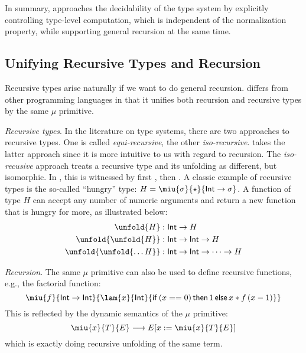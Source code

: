 In summary, \name approaches the decidability of the type system by explicitly controlling type-level computation, which is independent of the normalization property, while supporting general recursion at the same time.

\subsection{Unifying Recursive Types and Recursion}


Recursive types arise naturally if we want to do general recursion. \name differs from other programming languages in that it unifies both recursion and recursive types by the same $\mu$ primitive.

\emph{Recursive types}. In the literature on type systems, there are two approaches to recursive types. One is called \emph{equi-recursive}, the other \emph{iso-recursive}. \name takes the latter approach since it is more intuitive to us with regard to recursion. The \emph{iso-recusive} approach treats a recursive type and its unfolding as different, but isomorphic. In \name, this is witnessed by first \castup, then \castdn. A classic example of recursive types is the so-called ``hungry'' type: $H = \miu{\sigma}{\star}{\mathsf{Int} \rightarrow \sigma}$. A function of type $H$ can accept any number of numeric arguments and return a new function that is hungry for more, as illustrated below:
\begin{align*}
\unfold{H} &: \mathsf{Int} \rightarrow H  \\
\unfold{\unfold{H}} &: \mathsf{Int} \rightarrow \mathsf{Int} \rightarrow H \\
\unfold{\unfold{\dots H}} &: \mathsf{Int} \rightarrow \mathsf{Int} \rightarrow \dots \rightarrow H
\end{align*}

\emph{Recursion}. The same $\mu$ primitive can also be used to define recursive functions, e.g., the factorial function: \[\miu{f}{\mathsf{Int} \rightarrow \mathsf{Int}}{\lam{x}{\mathsf{Int}}{\mathsf{if}\,(x == 0)\,\mathsf{then}\,1\,\mathsf{else}\,x * f\,(x - 1)}}\] This is reflected by the dynamic semantics of the $\mu$ primitive: 
\[\miu{x}{T}{E} \longrightarrow E[x:=\miu{x}{T}{E}]\]
which is exactly doing recursive unfolding of the same term.

